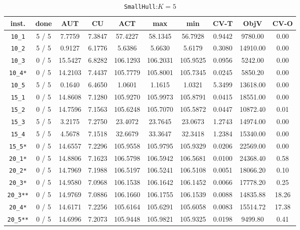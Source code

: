 \begin{table}[h!]
\begin{center}
\small
\begin{tabular}{| c | c | c | c | c | c | c | c | c | c |}
\hline
inst. & done & AUT & CU & ACT & max & min & CV-T & ObjV & CV-O \\
\hline
\verb|10_1| & 5 / 5 & 7.7759 & 7.3847 & 57.4227 & 58.1345 & 56.7928 & 0.9442 & 9780.00 & 0.00\\ 
\verb|10_2| & 5 / 5 & 0.9127 & 6.1776 & 5.6386 & 5.6630 & 5.6179 & 0.3080 & 14910.00 & 0.00\\ 
\verb|10_3| & 0 / 5 & 15.5427 & 6.8282 & 106.1293 & 106.2031 & 105.9525 & 0.0956 & 5242.00 & 0.00\\ 
\verb|10_4*| & 0 / 5 & 14.2103 & 7.4437 & 105.7779 & 105.8001 & 105.7345 & 0.0245 & 5850.20 & 0.00\\ 
\verb|10_5| & 5 / 5 & 0.1640 & 6.4650 & 1.0601 & 1.1615 & 1.0321 & 5.3499 & 13618.00 & 0.00\\ 
\verb|15_1| & 0 / 5 & 14.8608 & 7.1280 & 105.9270 & 105.9973 & 105.8791 & 0.0415 & 18551.00 & 0.00\\ 
\verb|15_2| & 0 / 5 & 14.7596 & 7.1563 & 105.6248 & 105.7070 & 105.5872 & 0.0447 & 10872.40 & 0.01\\ 
\verb|15_3| & 5 / 5 & 3.2175 & 7.2750 & 23.4072 & 23.7645 & 23.0673 & 1.2743 & 14974.00 & 0.00\\ 
\verb|15_4| & 5 / 5 & 4.5678 & 7.1518 & 32.6679 & 33.3647 & 32.3418 & 1.2384 & 15340.00 & 0.00\\ 
\verb|15_5*| & 0 / 5 & 14.6557 & 7.2296 & 105.9558 & 105.9795 & 105.9329 & 0.0206 & 22569.00 & 0.00\\ 
\verb|20_1*| & 0 / 5 & 14.8806 & 7.1623 & 106.5798 & 106.5942 & 106.5681 & 0.0100 & 24368.40 & 0.58\\ 
\verb|20_2*| & 0 / 5 & 14.7969 & 7.1988 & 106.5197 & 106.5241 & 106.5108 & 0.0051 & 18066.20 & 0.10\\ 
\verb|20_3*| & 0 / 5 & 14.9580 & 7.0968 & 106.1538 & 106.1642 & 106.1452 & 0.0066 & 17778.20 & 0.25\\ 
\verb|20_3**| & 0 / 5 & 14.9769 & 7.0886 & 106.1660 & 106.1755 & 106.1539 & 0.0088 & 14835.88 & 18.26\\ 
\verb|20_4*| & 0 / 5 & 14.6171 & 7.2256 & 105.6164 & 105.6291 & 105.6058 & 0.0083 & 15514.72 & 17.38\\ 
\verb|20_5**| & 0 / 5 & 14.6996 & 7.2073 & 105.9448 & 105.9821 & 105.9325 & 0.0198 & 9499.80 & 0.41\\ 
\hline
\end{tabular}
\caption{\texttt{SmallHull}:$K=5$}
\label{table:hull:5}
\end{center}
\end{table}


